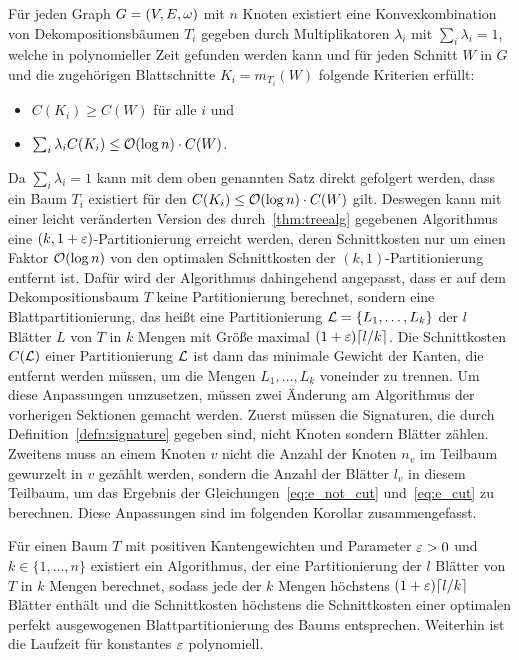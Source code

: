 \begin{thm}\label{thm:decomptrees}
    Für jeden Graph $G=(V, E, \omega)$ mit $n$ Knoten existiert eine Konvexkombination von Dekompositionsbäumen $T_i$ gegeben durch Multiplikatoren $\lambda_i$ mit $\sum_i \lambda_i = 1$, welche in polynomieller Zeit gefunden werden kann und für jeden Schnitt $W$ in $G$ und die zugehörigen Blattschnitte $K_i = m_{T_i}(W)$ folgende Kriterien erfüllt:
    \begin{itemize}
        \item $C(K_i) \geq C(W)$ für alle $i$ und
        \item $\sum_i \lambda_i C(K_i) \leq \mathcal{O}(\log n) \cdot C(W)$.
    \end{itemize}
\end{thm}

Da $\sum_i \lambda_i = 1$ kann mit dem oben genannten Satz direkt gefolgert werden, dass ein Baum $T_i$ existiert für den $C(K_i) \leq \mathcal{O}(\log n) \cdot C(W)$ gilt.
Deswegen kann mit einer leicht veränderten Version des durch~\ref{thm:treealg} gegebenen Algorithmus eine $(k,1 + \varepsilon)$\hyp Partitionierung erreicht werden, deren Schnittkosten nur um einen Faktor $\mathcal{O}(\log n)$ von den optimalen Schnittkosten der $(k, 1)$\hyp Partitionierung entfernt ist.
Dafür wird der Algorithmus dahingehend angepasst, dass er auf dem Dekompositionsbaum $T$ keine Partitionierung berechnet, sondern eine Blattpartitionierung, das heißt eine Partitionierung $\mathcal{L} = \{L_1, \ldots, L_k\}$ der $l$ Blätter $L$ von $T$ in $k$ Mengen mit Größe maximal $(1 + \eps) \ceil*{l/k}$.
Die Schnittkosten $C(\mathcal{L})$ einer Partitionierung $\mathcal{L}$ ist dann das minimale Gewicht der Kanten, die entfernt werden müssen, um die Mengen $L_1, \ldots, L_k$ voneinder zu trennen.
Um diese Anpassungen umzusetzen, müssen zwei Änderung am Algorithmus der vorherigen Sektionen gemacht werden. 
Zuerst müssen die Signaturen, die durch Definition~\ref{defn:signature} gegeben sind, nicht Knoten sondern Blätter zählen.
Zweitens muss an einem Knoten $v$ nicht die Anzahl der Knoten $n_v$ im Teilbaum gewurzelt in $v$ gezählt werden, sondern die Anzahl der Blätter $l_v$ in diesem Teilbaum, um das Ergebnis der Gleichungen~\eqref{eq:e_not_cut} und~\eqref{eq:e_cut} zu berechnen. 
Diese Anpassungen sind im folgenden Korollar zusammengefasst.

\begin{cor}\label{cor:leafpartitioning}
    Für einen Baum $T$ mit positiven Kantengewichten und Parameter $\varepsilon > 0$ und $k \in \{1, \ldots, n\}$ existiert ein Algorithmus, der eine Partitionierung der $l$ Blätter von $T$ in $k$ Mengen berechnet, sodass jede der $k$ Mengen höchstens $(1 + \eps) \ceil*{l/k}$ Blätter enthält und die Schnittkosten höchstens die Schnittkosten einer optimalen perfekt ausgewogenen Blattpartitionierung des Baums entsprechen. 
        Weiterhin ist die Laufzeit für konstantes $\varepsilon$ polynomiell.
\end{cor}

